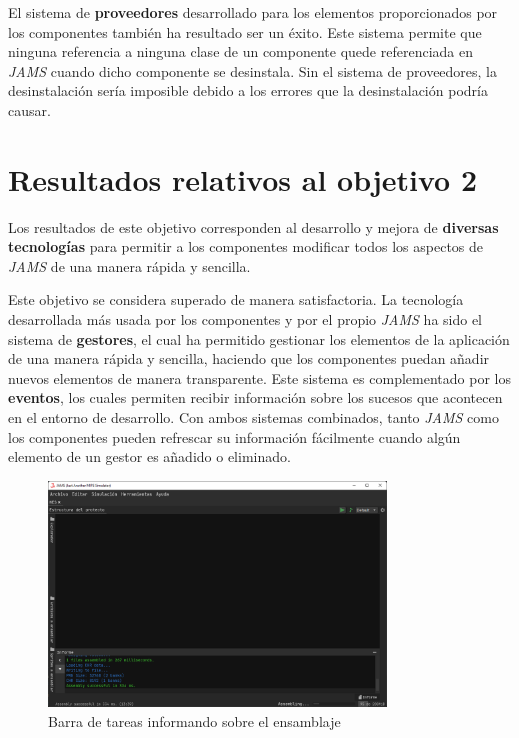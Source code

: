 El sistema de \textbf{proveedores} desarrollado para los elementos
proporcionados por los componentes también ha resultado ser un éxito.
Este sistema permite que ninguna referencia a ninguna clase de un
componente quede referenciada en \textit{JAMS} cuando dicho componente
se desinstala.
Sin el sistema de proveedores, la desinstalación sería imposible debido
a los errores que la desinstalación podría causar.


\section{Resultados relativos al objetivo 2}\label{sec:resultados-relativos-al-objetivo-2}

Los resultados de este objetivo corresponden al desarrollo y mejora de
\textbf{diversas tecnologías} para permitir a los componentes modificar
todos los aspectos de \textit{JAMS} de una manera rápida y sencilla.

Este objetivo se considera superado de manera satisfactoria.
La tecnología desarrollada más usada por los componentes
y por el propio \textit{JAMS} ha sido el sistema de \textbf{gestores},
el cual ha permitido gestionar los elementos de la aplicación
de una manera rápida y sencilla, haciendo que los componentes
puedan añadir nuevos elementos de manera transparente.
Este sistema es complementado por los \textbf{eventos},
los cuales permiten recibir información sobre los sucesos que
acontecen en el entorno de desarrollo.
Con ambos sistemas combinados, tanto \textit{JAMS} como los componentes
pueden refrescar su información fácilmente cuando algún elemento
de un gestor es añadido o eliminado.

\begin{figure}[h]
    \centering
    \includegraphics[width=0.8\textwidth]{images/results/jams-tasks}
    \caption{Barra de tareas informando sobre el ensamblaje}
    \label{fig:jams-tasks}
\end{figure}

